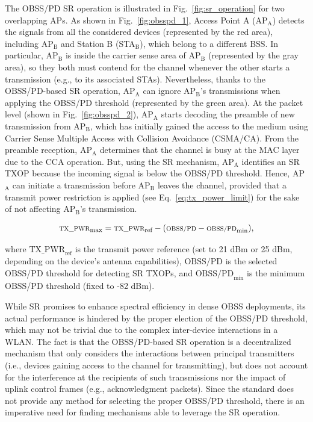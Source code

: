 \documentclass[10pt,a4paper,twocolumn]{article}
\newcommand{\ITUpar}{\vspace{8pt}\par}
\begin{document}
The OBSS/PD SR operation is illustrated in Fig.~\ref{fig:sr_operation} for two overlapping APs. As shown in Fig.~\ref{fig:obsspd_1}, Access Point A (AP$_\text{A}$) detects the signals from all the considered devices (represented by the red area), including AP$_\text{B}$ and Station B (STA$_\text{B}$), which belong to a different BSS. In particular, AP$_\text{B}$ is inside the carrier sense area of AP$_\text{B}$ (represented by the gray area), so they both must contend for the channel whenever the other starts a transmission (e.g., to its associated STAs). Nevertheless, thanks to the OBSS/PD-based SR operation, AP$_\text{A}$ can ignore AP$_\text{B}$'s transmissions when applying the OBSS/PD threshold (represented by the green area). At the packet level (shown in Fig.~\ref{fig:obsspd_2}), AP$_\text{A}$ starts decoding the preamble of new transmission from AP$_\text{B}$, which has initially gained the access to the medium using Carrier Sense Multiple Access with Collision Avoidance (CSMA/CA). From the preamble reception, AP$_\text{A}$ determines that the channel is busy at the MAC layer due to the CCA operation. But, using the SR mechanism, AP$_\text{A}$ identifies an SR TXOP because the incoming signal is below the OBSS/PD threshold. Hence, AP$_\text{A}$ can initiate a transmission before AP$_\text{B}$ leaves the channel, provided that a transmit power restriction is applied (see Eq.~\eqref{eq:tx_power_limit}) for the sake of not affecting AP$_\text{B}$'s transmission.

\begin{equation}
	\scriptsize
	\text{TX\_PWR}_\text{max} = \text{TX\_PWR}_\text{ref} - (\text{OBSS/PD} - \text{OBSS/PD}_\text{min}),	\label{eq:tx_power_limit}
\end{equation}

where $\text{TX\_PWR}_\text{ref}$ is the transmit power reference (set to 21 dBm or 25 dBm, depending on the device's antenna capabilities), $\text{OBSS/PD}$ is the selected OBSS/PD threshold for detecting SR TXOPs, and $\text{OBSS/PD}_\text{min}$ is the minimum OBSS/PD threshold (fixed to -82 dBm).\ITUpar

While SR promises to enhance spectral efficiency in dense OBSS deployments, its actual performance is hindered by the proper election of the OBSS/PD threshold, which may not be trivial due to the complex inter-device interactions in a WLAN. The fact is that the OBSS/PD-based SR operation is a decentralized mechanism that only considers the interactions between principal transmitters (i.e., devices gaining access to the channel for transmitting), but does not account for the interference at the recipients of such transmissions nor the impact of uplink control frames (e.g., acknowledgment packets). Since the standard does not provide any method for selecting the proper OBSS/PD threshold, there is an imperative need for finding mechanisms able to leverage the SR operation.\ITUpar
\end{document}
